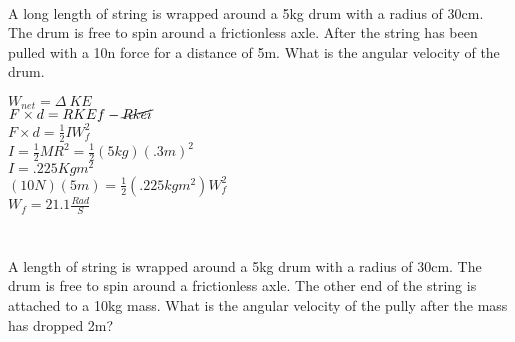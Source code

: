 \documentclass{article}
\begin{document}
            \\ [15pt]
        \hrulefill
        \subsubsection{}
        \hrulefill
        A long length of string is wrapped around a 5kg drum with a radius of 30cm. The drum is free to spin around a frictionless axle. After the string has been pulled with a 10n force for a distance of 5m. What is the angular velocity of the drum.

        $W_{net} = \Delta~KE$ \\ [10pt]

        $F \times d = RKEf - \cancel{Rkei} $\\ [10pt]
        $F \times d= \frac{1}{2} IW_f^2$ \\ [10pt]

        $I = \frac{1}{2}MR^2 = \frac{1}{2} (5kg)(.3m)^2$ \\ [10pt]
        $I = .225Kgm^2$ \\ [10pt]

        $(10N)(5m) = \frac{1}{2}(.225kgm^2)W_f^2$ \\ [10pt]
        $W_f = 21.1 \frac{Rad}{S}$

        \hrulefill
        \subsubsection{}
        \hrulefill \\
            A length of string is wrapped around a 5kg drum with a radius of 30cm. The drum is free to spin around a frictionless axle. The other end of the string is attached to a 10kg mass. What is the angular velocity of the pully after the mass has dropped 2m? \\
            [15pt]
        \\ [15pt]
\end{document}
